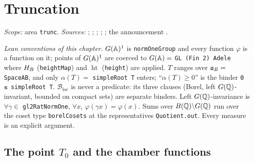 \chapter{Truncation}\label{ch:ch-06-truncation}

\noindent\emph{Scope:} area \texttt{trunc}. \emph{Sources:} \cite[§§6, 8, 9, 13]{AIntro}; \cite[§1]{A-II}; \cite[§6, Lemma~6.4]{A-I};
\cite[Lecture II §§2--4, Lecture III §§2--3]{Gel}; \cite[§4]{A-R1}; the announcement \cite{A-Tr}.

\noindent\emph{Lean conventions of this chapter.} $G(\mathbb{A})^1$ is \texttt{normOneGroup} and every function $\varphi$ is a function on it; points of $G(\mathbb{A})^1$
are coerced to $G(\mathbb{A})=$ \texttt{GL (Fin 2) Adele} where $H_B$ (\texttt{heightMap}) and $\operatorname{ht}$ (\texttt{height}) are applied. $T$ ranges over
$\mathfrak{a}_B=$ \texttt{SpaceAB}, and only $\alpha(T)=$ \texttt{simpleRoot T} enters; ``$\alpha(T)\ge0$'' is the binder \texttt{0 ≤ simpleRoot T}.
$\mathcal B_{\mathrm{loc}}$ is never a predicate: its three clauses (Borel, left $G(\mathbb{Q})$-invariant, bounded on compact sets) are separate binders.
Left $G(\mathbb{Q})$-invariance is $\forall\gamma\in$ \texttt{gl2RatNormOne}, $\forall x$, $\varphi(\gamma x)=\varphi(x)$. Sums over $B(\mathbb{Q})\backslash G(\mathbb{Q})$ run over the
coset type \texttt{borelCosets} at the representatives \texttt{Quotient.out}. Every measure is an explicit argument.


\section{The point \texorpdfstring{$T_0$}{T0} and the chamber functions}\label{sec:trunc-t-zero}


